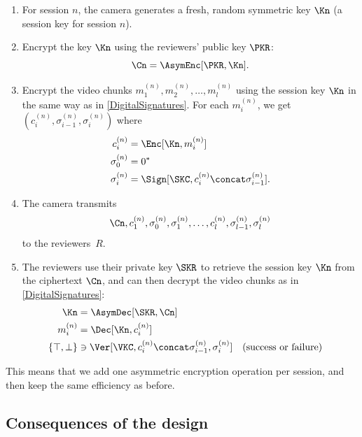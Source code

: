\begin{enumerate}
  \item For session \(n\), the camera generates a fresh, random symmetric key 
    \(\Kn\) (a session key for session \(n\)).
  \item Encrypt the key \(\Kn\) using the reviewers' public key \(\PKR\):
    \[
      \Cn = \AsymEnc[\PKR, \Kn].
    \]
  \item Encrypt the video chunks \(m_1^{(n)}, m_2^{(n)}, \ldots, m_l^{(n)}\) 
    using the session key \(\Kn\) in the same way as in 
    \cref{DigitalSignatures}.
    For each \(m_i^{(n)}\), we get \((c_i^{(n)}, \sigma_{i-1}^{(n)}, 
    \sigma_i^{(n)})\) where
    \begin{align*}
      c_i^{(n)}      &= \Enc[\Kn, m_i^{(n)}] \\
      \sigma_0^{(n)} &= 0^* \\
      \sigma_i^{(n)} &= \Sign[\SKC, c_i^{(n)} \concat \sigma_{i-1}^{(n)}].
    \end{align*}
  \item The camera transmits \[
      \Cn, c_1^{(n)}, \sigma_0^{(n)}, \sigma_1^{(n)},
      \ldots,
      c_l^{(n)}, \sigma_{l-1}^{(n)}, \sigma_l^{(n)}
    \] to the reviewers~\(R\).
  \item The reviewers use their private key \(\SKR\) to retrieve the session 
    key \(\Kn\) from the ciphertext \(\Cn\),
    and can then decrypt the video chunks as in \cref{DigitalSignatures}:
    \begin{align*}
      \Kn &= \AsymDec[\SKR, \Cn] \\
      m_i^{(n)} &= \Dec[\Kn, c_i^{(n)}] \\
      \{\top, \bot\} &\ni
        \Ver[\VKC, c_i^{(n)} \concat \sigma_{i-1}^{(n)}, \sigma_i^{(n)}]
                && \text{(success or failure)}
    \end{align*}
\end{enumerate}

This means that we add one asymmetric encryption operation per session, and 
then keep the same efficiency as before.

\subsection{Consequences of the design}

